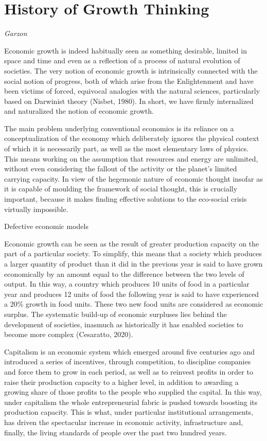 \documentclass[
]{book}
\begin{document}
\hypertarget{history-of-growth-thinking}{%
\section{History of Growth Thinking}\label{history-of-growth-thinking}}

\emph{Garzon}

Economic growth is indeed habitually seen as something desirable, limited in space and time and even as a reflection of a process of natural evolution of societies. The very notion of economic growth is intrinsically connected with the social notion of progress, both of which arise from the Enlightenment and have been victims of forced, equivocal analogies with the natural sciences, particularly based on Darwinist theory (Nisbet, 1980). In short, we have firmly internalized and naturalized the notion of economic growth.

The main problem underlying conventional economics is its reliance on a conceptualization of the economy which deliberately ignores the physical context of which it is necessarily part, as well as the most elementary laws of physics. This means working on the assumption that resources and energy are unlimited, without even considering the fallout of the activity or the planet's limited carrying capacity. In view of the hegemonic nature of economic thought insofar as it is capable of moulding the framework of social thought, this is crucially important, because it makes finding effective solutions to the eco-social crisis virtually impossible.

Defective economic models

Economic growth can be seen as the result of greater production capacity on the part of a particular society. To simplify, this means that a society which produces a larger quantity of product than it did in the previous year is said to have grown economically by an amount equal to the difference between the two levels of output. In this way, a country which produces 10 units of food in a particular year and produces 12 units of food the following year is said to have experienced a 20\% growth in food units. These two new food units are considered as economic surplus. The systematic build-up of economic surpluses lies behind the development of societies, inasmuch as historically it has enabled societies to become more complex (Cesaratto, 2020).

Capitalism is an economic system which emerged around five centuries ago and introduced a series of incentives, through competition, to discipline companies and force them to grow in each period, as well as to reinvest profits in order to raise their production capacity to a higher level, in addition to awarding a growing share of those profits to the people who supplied the capital. In this way, under capitalism the whole entrepreneurial fabric is pushed towards boosting its production capacity. This is what, under particular institutional arrangements, has driven the spectacular increase in economic activity, infrastructure and, finally, the living standards of people over the past two hundred years.
\end{document}
